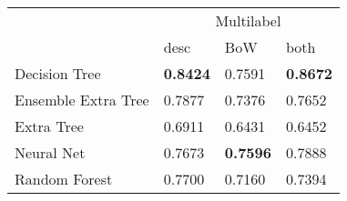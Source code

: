 \begin{tabular}{|l|l|l|l| }
\hline
 &  \multicolumn{3}{c|}{Multilabel} \\
\cline{2-4} & desc & BoW & both \\ \hline
Decision Tree       & {\bf 0.8424} & 0.7591 & {\bf 0.8672}\\
Ensemble Extra Tree & 0.7877 & 0.7376 & 0.7652\\
Extra Tree          & 0.6911 & 0.6431 & 0.6452\\
Neural Net          & 0.7673 & {\bf 0.7596} & 0.7888\\
Random Forest       & 0.7700 & 0.7160 & 0.7394\\
\hline
\end{tabular}